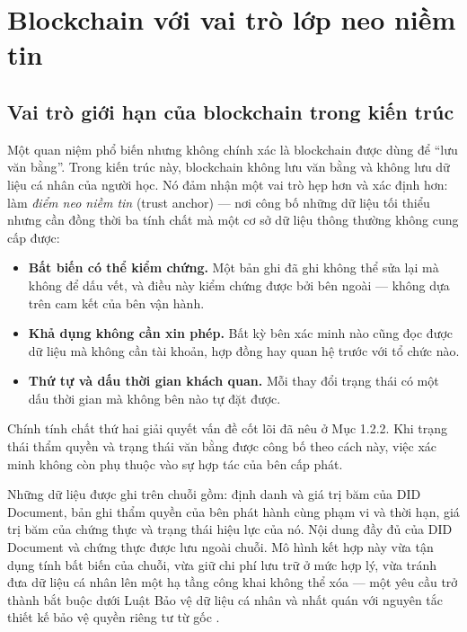 \section{Blockchain với vai trò lớp neo niềm tin}

\subsection{Vai trò giới hạn của blockchain trong kiến trúc}

Một quan niệm phổ biến nhưng không chính xác là blockchain được dùng để {``}lưu văn bằng{''}. Trong kiến trúc này, blockchain không lưu văn bằng và không lưu dữ liệu cá nhân của người học. Nó đảm nhận một vai trò hẹp hơn và xác định hơn: làm \emph{điểm neo niềm tin} (trust anchor) --- nơi công bố những dữ liệu tối thiểu nhưng cần đồng thời ba tính chất mà một cơ sở dữ liệu thông thường không cung cấp được:

\begin{itemize}
    \item \textbf{Bất biến có thể kiểm chứng.} Một bản ghi đã ghi không thể sửa lại mà không để dấu vết, và điều này kiểm chứng được bởi bên ngoài --- không dựa trên cam kết của bên vận hành.
    \item \textbf{Khả dụng không cần xin phép.} Bất kỳ bên xác minh nào cũng đọc được dữ liệu mà không cần tài khoản, hợp đồng hay quan hệ trước với tổ chức nào.
    \item \textbf{Thứ tự và dấu thời gian khách quan.} Mỗi thay đổi trạng thái có một dấu thời gian mà không bên nào tự đặt được.
\end{itemize}

Chính tính chất thứ hai giải quyết vấn đề cốt lõi đã nêu ở Mục 1.2.2. Khi trạng thái thẩm quyền và trạng thái văn bằng được công bố theo cách này, việc xác minh không còn phụ thuộc vào sự hợp tác của bên cấp phát.

Những dữ liệu được ghi trên chuỗi gồm: định danh và giá trị băm của DID Document, bản ghi thẩm quyền của bên phát hành cùng phạm vi và thời hạn, giá trị băm của chứng thực và trạng thái hiệu lực của nó. Nội dung đầy đủ của DID Document và chứng thực được lưu ngoài chuỗi. Mô hình kết hợp này vừa tận dụng tính bất biến của chuỗi, vừa giữ chi phí lưu trữ ở mức hợp lý, vừa tránh đưa dữ liệu cá nhân lên một hạ tầng công khai không thể xóa --- một yêu cầu trở thành bắt buộc dưới Luật Bảo vệ dữ liệu cá nhân \cite{LuatBVDLCN2025} và nhất quán với nguyên tắc thiết kế bảo vệ quyền riêng tư từ gốc \cite{Cavoukian2009}.

